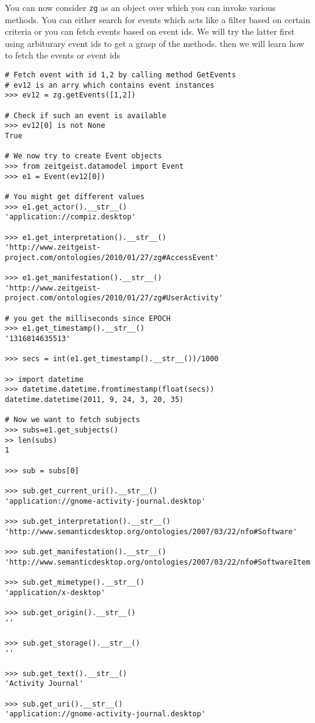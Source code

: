 You can now consider \texttt{zg} as an object over which you can invoke various 
methods. You can either search for events which acts like a filter based on certain 
criteria or you can fetch events based on event ids. We will try the latter first 
using arbiturary event ids to get a grasp of the methods. then we will learn how to 
fetch the events or event ids

\begin{center}
\begin{verbatim}
# Fetch event with id 1,2 by calling method GetEvents
# ev12 is an arry which contains event instances
>>> ev12 = zg.getEvents([1,2])

# Check if such an event is available
>>> ev12[0] is not None
True

# We now try to create Event objects
>>> from zeitgeist.datamodel import Event
>>> e1 = Event(ev12[0])

# You might get different values
>>> e1.get_actor().__str__()
'application://compiz.desktop'

>>> e1.get_interpretation().__str__()
'http://www.zeitgeist-project.com/ontologies/2010/01/27/zg#AccessEvent'

>>> e1.get_manifestation().__str__()
'http://www.zeitgeist-project.com/ontologies/2010/01/27/zg#UserActivity'

# you get the milliseconds since EPOCH
>>> e1.get_timestamp().__str__()
'1316814635513'

>>> secs = int(e1.get_timestamp().__str__())/1000

>> import datetime
>>> datetime.datetime.fromtimestamp(float(secs))
datetime.datetime(2011, 9, 24, 3, 20, 35)

# Now we want to fetch subjects
>>> subs=e1.get_subjects()
>> len(subs)
1

>>> sub = subs[0]

>>> sub.get_current_uri().__str__()
'application://gnome-activity-journal.desktop'

>>> sub.get_interpretation().__str__()
'http://www.semanticdesktop.org/ontologies/2007/03/22/nfo#Software'

>>> sub.get_manifestation().__str__()
'http://www.semanticdesktop.org/ontologies/2007/03/22/nfo#SoftwareItem'

>>> sub.get_mimetype().__str__()
'application/x-desktop'

>>> sub.get_origin().__str__()
''

>>> sub.get_storage().__str__()
''

>>> sub.get_text().__str__()
'Activity Journal'

>>> sub.get_uri().__str__()
'application://gnome-activity-journal.desktop'


\end{verbatim}
\end{center}
